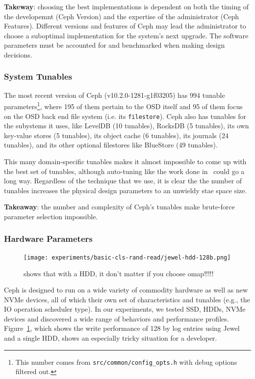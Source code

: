 \documentclass[10pt,twocolumn]{article}
\begin{document}
\textbf{Takeway}: choosing the best implementations is dependent on both the
timing of the developemnt (Ceph Version) and the expertise of the administrator
(Ceph Features). Different versions and features of Ceph may lead the
administrator to choose a suboptimal implementation for the system's next
upgrade. The software parameters must be accounted for and benchmarked when
making design decisions.

\subsubsection{System Tunables}

The most recent version of Ceph (v10.2.0-1281-g1f03205) has 994 tunable
parameters\footnote{This number comes from \texttt{src/common/config\_opts.h}
with debug options filtered out.}, where 195 of them pertain to the OSD itself
and 95 of them focus on the OSD back end file system (i.e. its
\texttt{filestore}). Ceph also has tunables for the subystems it uses, like
LevelDB (10 tunables), RocksDB (5 tunables), its own key-value stores (5
tunables), its object cache (6 tunables), its journals (24 tunables), and its
other optional filestores like BlueStore (49 tunables).

This many domain-specific tunables makes it almost impossible to come up with
the best set of tunables, although auto-tuning like the work done
in~\cite{behzad:sc2013-autotuning} could go a long way. Regardless of the
technique that we use, it is clear the the number of tunables increases the
physical design parameters to an unwieldy stae space size.

\textbf{Takeaway}: the number and complexity of Ceph's tunables make
brute-force parameter selection impossible.

\subsubsection{Hardware Parameters}

\begin{figure}[t]
	\centering
	\texttt{[image: experiments/basic-cls-rand-read/jewel-hdd-128b.png]}
	\caption{shows that with a HDD, it don't matter if you choose omap!!!!!}
	\label{fig:jewel-hdd-128b}
\end{figure}

Ceph is designed to run on a wide variety of commodity hardware as well as new
NVMe devices, all of which their own set of characteristics and tunables (e.g.,
the IO operation scheduler type). In our experiments, we tested SSD, HDDs, NVMe
devices and discovered a wide range of behaviors and performance profiles.
Figure~\ref{fig:jewel-hdd-128b}, which shows the write performance of 128 by
log entries using Jewel and a single HDD, shows an especially tricky situation
for a developer. 
\end{document}

